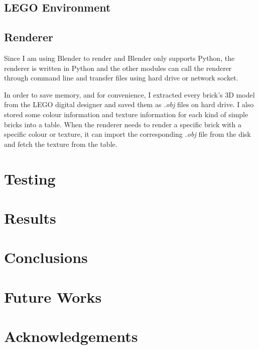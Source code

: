\documentclass[a4paper]{article}
\begin{document}
        
        \subsection{LEGO Environment}
        
        
        \subsection{Renderer}
        
            Since I am using Blender to render and Blender only supports Python, the renderer is written in Python and the other modules can call the renderer through command line and transfer files using hard drive or network socket. 
            
            In order to save memory, and for convenience, I extracted every brick's 3D model from the LEGO digital designer and saved them as \textit{.obj} files on hard drive. I also stored some colour information and texture information for each kind of simple bricks into a table. When the renderer needs to render a specific brick with a specific colour or texture, it can import the corresponding \textit{.obj} file from the disk and fetch the texture from the table. 
            
            
        
        
    
    \section{Testing}
    
    \section{Results}
    
    \section{Conclusions}
    
    \section{Future Works}
    
    \section{Acknowledgements}
    
    
    
    \nocite{*}
\end{document}

